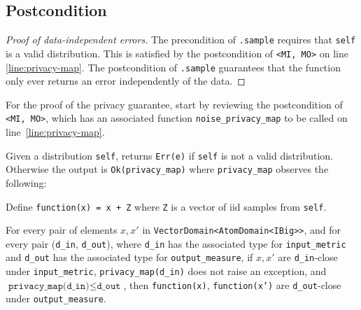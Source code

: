 \documentclass{article}
\begin{document}
\subsection*{Postcondition}
\begin{theorem}
\end{theorem}

\begin{proof}[Proof of data-independent errors]
    The precondition of \texttt{.sample} requires that \texttt{self} is a valid distribution.
    This is satisfied by the postcondition of \texttt{<MI, MO>} on line \ref{line:privacy-map}.
    The postcondition of \texttt{.sample} guarantees that the function only ever returns an error independently of the data.
\end{proof}

For the proof of the privacy guarantee, start by reviewing the postcondition of \texttt{<MI, MO>},
which has an associated function \texttt{noise\_privacy\_map} to be called on line~\ref{line:privacy-map}.
\begin{lemma}
    \label{lemma:new-privacy-map}
    Given a distribution \texttt{self},
    returns \texttt{Err(e)} if \texttt{self} is not a valid distribution.
    Otherwise the output is \texttt{Ok(privacy\_map)}
    where \texttt{privacy\_map} observes the following:

    Define \texttt{function(x) = x + Z} where \texttt{Z} is a vector of iid samples from \texttt{self}.

    For every pair of elements $x, x'$ in \texttt{VectorDomain<AtomDomain<IBig>{}>},
    and for every pair (\texttt{d\_in}, \texttt{d\_out}),
    where \texttt{d\_in} has the associated type for \texttt{input\_metric} and \texttt{d\_out} has the associated type for \texttt{output\_measure},
    if $x, x'$ are \texttt{d\_in}-close under \texttt{input\_metric}, \texttt{privacy\_map(d\_in)} does not raise an exception,
    and $\texttt{privacy\_map(d\_in)} \leq \texttt{d\_out}$,
    then \texttt{function(x)}, \texttt{function(x')} are \texttt{d\_out}-close under \texttt{output\_measure}.
\end{lemma}
\end{document}
